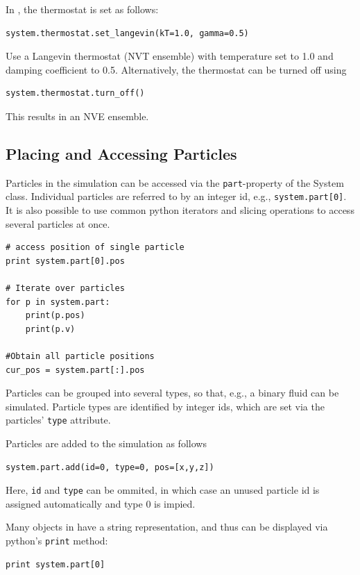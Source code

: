 \documentclass[
paper=a4,                       %
fontsize=11pt,                  %
twoside,                        %
footsepline,                    %
headsepline,                    %
headinclude=false,              %
footinclude=false,              %
pagesize,                       %
]{scrartcl}
\begin{document}
In \es{}, the thermostat is set as follows:
{\small\vspace{0,2cm}
\begin{lstlisting}
system.thermostat.set_langevin(kT=1.0, gamma=0.5)
\end{lstlisting}}\vspace{0,2cm}
\noindent Use a Langevin thermostat (NVT ensemble) with temperature set to 1.0 and damping coefficient to 0.5. Alternatively, the thermostat can be turned off using
{\small\vspace{0,2cm}
\begin{lstlisting}
system.thermostat.turn_off()
\end{lstlisting}}\vspace{0,2cm}
\noindent This results in an NVE ensemble.


\subsection{Placing and Accessing Particles}

Particles in the simulation can be accessed via the \texttt{part}-property of the System class. Individual particles are referred to by an integer id, e.g., \texttt{system.part[0]}. It is also possible to use common python iterators and slicing operations to access several particles at once.
\begin{lstlisting}
# access position of single particle
print system.part[0].pos

# Iterate over particles
for p in system.part:
    print(p.pos)
    print(p.v)

#Obtain all particle positions
cur_pos = system.part[:].pos
\end{lstlisting}
Particles can be grouped into several types, so that, e.g., a binary fluid can be simulated. Particle types are identified by integer ids, which are set via the particles' \texttt{type} attribute. 

Particles are added to the simulation as follows
\begin{lstlisting}
system.part.add(id=0, type=0, pos=[x,y,z])
\end{lstlisting}\vspace{0,2cm}
Here, \texttt{id} and \texttt{type} can be ommited, in which case an unused particle id is assigned automatically and type 0 is impied.

Many objects in \es{} have a string representation, and thus can be displayed via python's \texttt{print} method:
\begin{lstlisting}
print system.part[0]
\end{lstlisting}\vspace{0,2cm}
\end{document}

